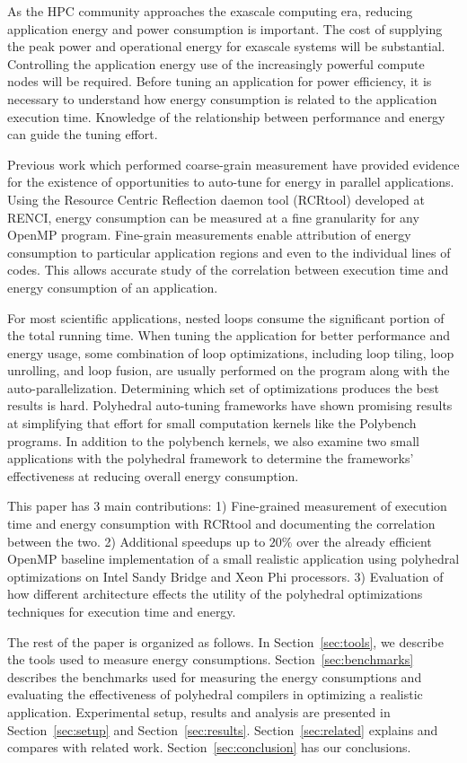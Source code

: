 As the HPC community approaches the exascale computing era, reducing application energy 
and power consumption is important. The cost of supplying the peak power and 
operational energy for exascale systems will be substantial. 
Controlling the application energy use of the increasingly powerful
compute nodes will be required. 
Before tuning an application for power efficiency, it is necessary to 
understand how energy consumption is related to the application execution time.  
Knowledge of the relationship between performance and energy can guide the tuning effort.

Previous work which performed coarse-grain measurement have provided evidence for the 
existence of opportunities to auto-tune for energy in parallel applications\cite{Tiwari:EnergyAutoTune}.
Using the Resource Centric Reflection daemon tool (RCRtool) developed at RENCI\cite{us}, 
energy 
consumption can be measured at a fine granularity for any OpenMP program. Fine-grain measurements
enable attribution of energy consumption to particular application regions and 
even to the individual lines of codes. This allows accurate study of the correlation between execution time
and energy consumption of an application.

For most scientific applications, nested loops consume the significant 
portion of the total running time. When tuning the application for
better performance and energy usage, some combination of loop optimizations, including loop 
tiling, loop unrolling, and loop fusion, are usually performed on the 
program along with the auto-parallelization.
Determining which set of optimizations produces the best results is hard.
Polyhedral auto-tuning frameworks have shown promising results at simplifying that effort\cite{EJ2011,EJ2012,EJ2013}
for small computation kernels like the Polybench programs\cite{Polybench}. 
In addition to the polybench kernels, we also examine two small applications with the polyhedral framework
to determine the frameworks' effectiveness at reducing overall energy consumption.

This paper has 3 main contributions: 1)  
Fine-grained measurement of execution time and energy consumption with RCRtool
and documenting the correlation between the two. 
2) Additional speedups up to $20\%$ over the already efficient OpenMP baseline 
implementation of a small realistic application using polyhedral optimizations 
on Intel Sandy Bridge and Xeon Phi processors. 3) 
Evaluation of how different architecture effects the utility of the 
polyhedral optimizations techniques for execution time and energy.

The rest of the paper is organized as follows. In Section~\ref{sec:tools}, we describe the tools
used to measure energy consumptions. Section~\ref{sec:benchmarks} describes the benchmarks used for  
measuring the energy consumptions and evaluating the effectiveness of polyhedral 
compilers in optimizing a realistic application. Experimental setup, results and analysis are presented in Section~\ref{sec:setup} and Section~\ref{sec:results}. 
Section~\ref{sec:related} explains and compares with related work. Section~\ref{sec:conclusion} has 
our conclusions.

